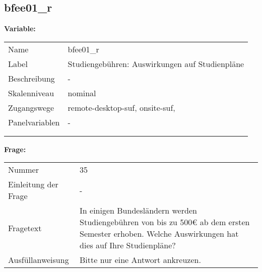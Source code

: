 	
	
	\subsection{bfee01\_r}
	\label{subSection:bfee01_r}

	\noindent\textbf{Variable:}\\
		\begin{tabular}{lL{11.3cm}}
			\label{tableVariable:bfee01_r}
			Name & bfee01\_r \\
			Label & Studiengebühren: Auswirkungen auf Studienpläne \\
			Beschreibung & - \\
			Skalenniveau & nominal \\
			Zugangswege &
				remote-desktop-suf,
				onsite-suf,
 \\
			Panelvariablen & -
			 \\
			 \\
 \\
		\end{tabular}

		\vspace*{1 cm}
		\noindent\textbf{Frage:}\\
		\begin{tabular}{lL{11.3cm}}
			\label{tableQuestion:bfee01_r}
			Nummer & 35 \\
			Einleitung der Frage & - \\
			Fragetext & In einigen Bundesländern werden Studiengebühren von bis zu 500€ ab dem ersten Semester erhoben. Welche Auswirkungen hat dies auf Ihre Studienpläne? \\
			Ausfüllanweisung & Bitte nur eine Antwort ankreuzen. \\
		\end{tabular}





